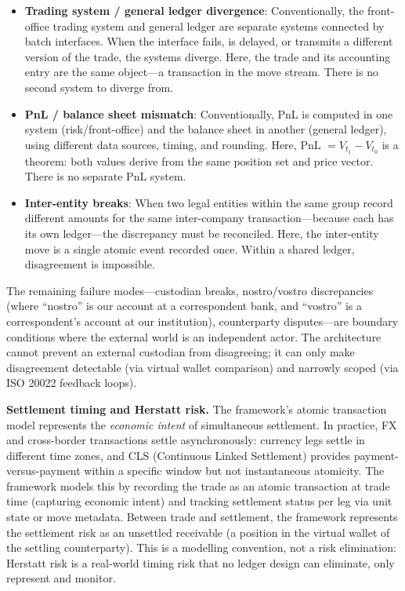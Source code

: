 \documentclass[11pt,a4paper]{article}
\begin{document}
\begin{itemize}
\item \textbf{Trading system / general ledger divergence}: Conventionally, the front-office trading system and general ledger are separate systems connected by batch interfaces. When the interface fails, is delayed, or transmits a different version of the trade, the systems diverge. Here, the trade and its accounting entry are the same object---a transaction in the move stream. There is no second system to diverge from.

\item \textbf{PnL / balance sheet mismatch}: Conventionally, PnL is computed in one system (risk/front-office) and the balance sheet in another (general ledger), using different data sources, timing, and rounding. Here, PnL $= V_{t_1} - V_{t_0}$ is a theorem: both values derive from the same position set and price vector. There is no separate PnL system.

\item \textbf{Inter-entity breaks}: When two legal entities within the same group record different amounts for the same inter-company transaction---because each has its own ledger---the discrepancy must be reconciled. Here, the inter-entity move is a single atomic event recorded once. Within a shared ledger, disagreement is impossible.
\end{itemize}

The remaining failure modes---custodian breaks, nostro/vostro discrepancies (where ``nostro'' is our account at a correspondent bank, and ``vostro'' is a correspondent's account at our institution), counterparty disputes---are boundary conditions where the external world is an independent actor. The architecture cannot prevent an external custodian from disagreeing; it can only make disagreement detectable (via virtual wallet comparison) and narrowly scoped (via ISO 20022 feedback loops).

\noindent\textbf{Settlement timing and Herstatt risk.} The framework's atomic transaction model represents the \emph{economic intent} of simultaneous settlement. In practice, FX and cross-border transactions settle asynchronously: currency legs settle in different time zones, and CLS (Continuous Linked Settlement) provides payment-versus-payment within a specific window but not instantaneous atomicity. The framework models this by recording the trade as an atomic transaction at trade time (capturing economic intent) and tracking settlement status per leg via unit state or move metadata. Between trade and settlement, the framework represents the settlement risk as an unsettled receivable (a position in the virtual wallet of the settling counterparty). This is a modelling convention, not a risk elimination: Herstatt risk is a real-world timing risk that no ledger design can eliminate, only represent and monitor.
\end{document}
